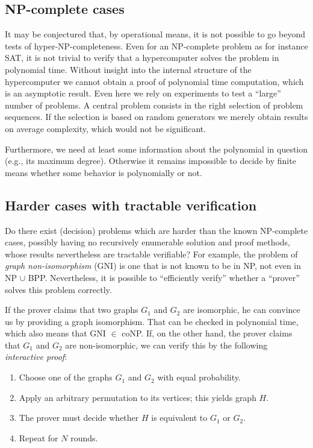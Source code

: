 \documentclass[12pt]{article}
\begin{document}
\subsection{NP-complete cases}

It may be conjectured that, by operational means,  it is not possible to go beyond
tests of hyper-NP-completeness.
Even for an NP-complete problem as for instance SAT, it is not trivial to
verify that a hypercomputer solves the problem in polynomial time.
Without insight into the internal structure of the hypercomputer
we cannot obtain a proof of polynomial time computation,
which is an asymptotic result. Even here we rely on
experiments to test a ``large'' number of
problems. A central problem consists in the right selection of
problem sequences. If the selection is based on random generators
we merely obtain results on average complexity, which would not be
significant.

Furthermore, we need at least some information about the polynomial
in question (e.g., its maximum degree). Otherwise it remains
impossible to decide by finite means whether some behavior
is polynomially or not.


\subsection{Harder cases with tractable verification}

Do there exist (decision) problems which are harder
than the known NP-complete cases,
possibly having no recursively enumerable solution and proof methods,
whose results nevertheless are tractable verifiable?
For example, the problem of \emph{graph non-isomorphism} (GNI) is one that is not
known to be in NP, not even in NP $\cup$ BPP. Nevertheless, it is
possible to ``efficiently verify'' whether a ``prover''
solves this problem correctly.

If the prover claims that two graphs $G_1$ and $G_2$ are isomorphic,
he can convince us by providing a graph isomorphism. That can be checked
in polynomial time, which also means that GNI $\in$ coNP.
If, on the other hand, the prover claims that $G_1$ and $G_2$ are
non-isomorphic, we can verify this by the following \emph{interactive proof}:

\begin{enumerate}
\item Choose one of the graphs $G_1$ and $G_2$ with equal probability. \label{I:1}
\item Apply an arbitrary permutation to its vertices; this yields graph $H$.
\item The prover must decide whether $H$ is equivalent to $G_1$ or $G_2$. \label{I:3}
\item Repeat for $N$ rounds.
\end{enumerate}
\end{document}
